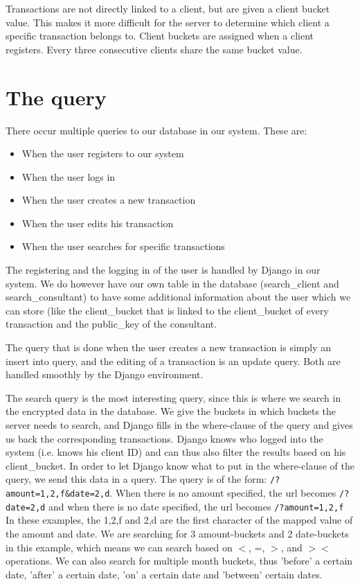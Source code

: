 \documentclass[a4paper]{article}
\begin{document}
      Transactions are not directly linked to a client, but are given a client bucket value. This makes it more difficult for the server to determine which client a specific transaction belongs to. Client buckets are assigned when a client registers. Every three consecutive clients share the same bucket value.
      
\section{The query}

	There occur multiple queries to our database in our system. These are: 
    
    \begin{itemize}
    	\item When the user registers to our system
        \item When the user logs in
        \item When the user creates a new transaction
        \item When the user edits his transaction
        \item When the user searches for specific transactions 
    \end{itemize}
    
    The registering and the logging in of the user is handled by Django in our system. We do however have our own table in the database (search\_client and search\_consultant) to have some additional information about the user which we can store (like the client\_bucket that is linked to the client\_bucket of every transaction and the public\_key of the consultant. 
    
    The query that is done when the user creates a new transaction is simply an insert into query, and the editing of a transaction is an update query. Both are handled smoothly by the Django environment.
    
    The search query is the most interesting query, since this is where we search in the encrypted data in the database. We give the buckets in which buckets the server needs to search, and Django fills in the where-clause of the query and gives us back the corresponding transactions. Django knows who logged into the system (i.e. knows his client ID) and can thus also filter the results based on his client\_bucket. In order to let Django know what to put in the where-clause of the query, we send this data in a query. The query is of the form: \verb;/?amount=1,2,f&date=2,d;. When there is no amount specified, the url becomes \verb;/?date=2,d; and when there is no date specified, the url becomes \verb;/?amount=1,2,f; In these examples, the 1,2,f and 2,d are the first character of the mapped value of the amount and date. We are searching for 3 amount-buckets and 2 date-buckets in this example, which means we can search based on $<$, =, $>$, and $><$ operations. We can also search for multiple month buckets, thus 'before' a certain date, 'after' a certain date, 'on' a certain date and 'between' certain dates. 
\end{document}
